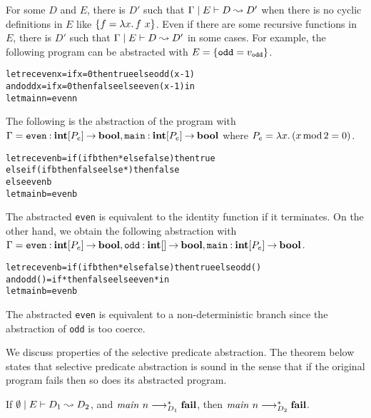 For some $D$ and $E$, there is $D'$ such that
${\Gamma} \mid {E} \vdash {D} \leadsto {D'}$ when there is no cyclic definitions in $E$
like $\{{f = \lambda{x}.\,{{f}~{x}}}\}$.
Even if there are some recursive functions in
$E$, there is $D'$ such that ${\Gamma} \mid {E} \vdash {D} \leadsto {D'}$ in some cases.
For example, the following program can be abstracted with $E = \{{\mathtt{odd} = v_\mathtt{odd}}\}$.
\begin{alltt}
let rec even x = if x = 0 then true else odd (x-1)
    and odd x = if x = 0 then false else even (x-1) in
let main n = even n
\end{alltt}
The following is the abstraction of the program with $\Gamma =
\mathtt{even}\mathbin{:}{\mathbf{int}[P_e]}\mathbin{\rightarrow}{\mathbf{bool}},
\mathtt{main}\mathbin{:}{\mathbf{int}[P_e]}\mathbin{\rightarrow}{\mathbf{bool}}$ where $P_e = \lambda{x}.\,{(x
\mathop{\mathrm{mod}} 2 = 0})$.
\begin{alltt}
let rec even b = if (if b then * else false) then true
                 else if (if b then false else *) then false
                 else even b
let main b = even b
\end{alltt}
The abstracted \texttt{even} is equivalent to the identity function if
it terminates.  On the other hand, we obtain the following abstraction
with $\Gamma = \mathtt{even}\mathbin{:}{\mathbf{int}[P_e]}\mathbin{\rightarrow}{\mathbf{bool}},
\mathtt{odd}\mathbin{:}{\mathbf{int}[]}\mathbin{\rightarrow}{\mathbf{bool}},
\mathtt{main}\mathbin{:}{\mathbf{int}[P_e]}\mathbin{\rightarrow}{\mathbf{bool}}$.
\begin{alltt}
let rec even b = if (if b then * else false) then true else odd ()
    and odd () = if * then false else even * in
let main b = even b
\end{alltt}
The abstracted \texttt{even} is equivalent to a non-deterministic branch
since the abstraction of \texttt{odd} is too coerce.

We discuss properties of the selective predicate abstraction.
The theorem below states that selective predicate abstraction is sound
in the sense that if the original program fails then so does its
abstracted program.
\begin{theorem}[soundness]
 If ${\emptyset} \mid {E} \vdash {D_1} \leadsto {D_2}$, and
 ${\mathit{main}}~{n} \longrightarrow_{D_1}^* \mathbf{fail}$, then
 ${\mathit{main}}~{n} \longrightarrow_{D_2}^* \mathbf{fail}$.
\end{theorem}


